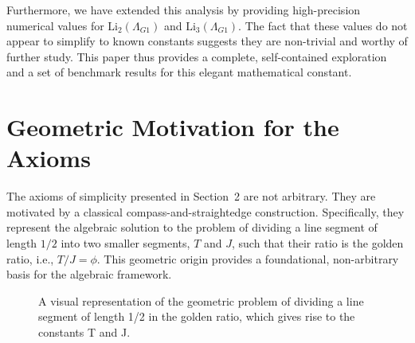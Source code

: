 \documentclass{amsart}
\theoremstyle{plain}
\theoremstyle{definition}
\theoremstyle{remark}
\newcommand{\LambdaG}{\Lambda_{G1}}
\begin{document}
Furthermore, we have extended this analysis by providing high-precision numerical values for $\mathrm{Li}_2(\LambdaG)$ and $\mathrm{Li}_3(\LambdaG)$. The fact that these values do not appear to simplify to known constants suggests they are non-trivial and worthy of further study. This paper thus provides a complete, self-contained exploration and a set of benchmark results for this elegant mathematical constant.

\appendix
\section{Geometric Motivation for the Axioms}
\label{app:A}
The axioms of simplicity presented in Section~2 are not arbitrary. They are motivated by a classical compass-and-straightedge construction. Specifically, they represent the algebraic solution to the problem of dividing a line segment of length $1/2$ into two smaller segments, $T$ and $J$, such that their ratio is the golden ratio, i.e., $T/J = \phi$. This geometric origin provides a foundational, non-arbitrary basis for the algebraic framework.

\begin{figure}[htbp]
    \centering
    \caption{A visual representation of the geometric problem of dividing a line segment of length 1/2 in the golden ratio, which gives rise to the constants T and J.}
    \label{fig:geometry}
\end{figure}
\end{document}
